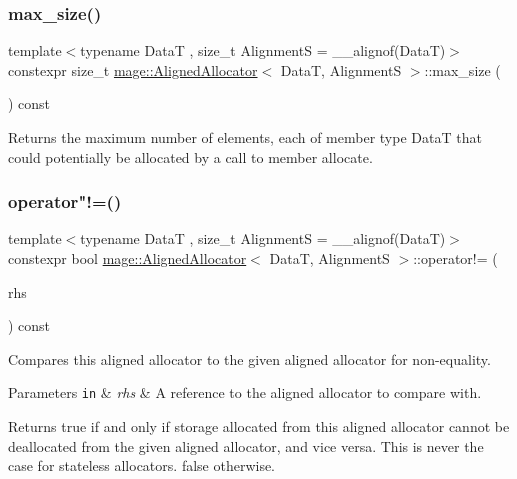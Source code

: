 \subsubsection{\texorpdfstring{max\+\_\+size()}{max\_size()}}
{\footnotesize\ttfamily template$<$typename DataT , size\+\_\+t AlignmentS = \+\_\+\+\_\+alignof(\+Data\+T)$>$ \\
constexpr size\+\_\+t \hyperlink{structmage_1_1_aligned_allocator}{mage\+::\+Aligned\+Allocator}$<$ DataT, AlignmentS $>$\+::max\+\_\+size (\begin{DoxyParamCaption}{ }\end{DoxyParamCaption}) const\hspace{0.3cm}{\ttfamily [noexcept]}}

Returns the maximum number of elements, each of member type {\ttfamily DataT} that could potentially be allocated by a call to member allocate. \hypertarget{structmage_1_1_aligned_allocator_ad5441594e288932744eb3d2528fc3ac7}{}\label{structmage_1_1_aligned_allocator_ad5441594e288932744eb3d2528fc3ac7} 
\subsubsection{\texorpdfstring{operator"!=()}{operator!=()}}
{\footnotesize\ttfamily template$<$typename DataT , size\+\_\+t AlignmentS = \+\_\+\+\_\+alignof(\+Data\+T)$>$ \\
constexpr bool \hyperlink{structmage_1_1_aligned_allocator}{mage\+::\+Aligned\+Allocator}$<$ DataT, AlignmentS $>$\+::operator!= (\begin{DoxyParamCaption}\item[{const \hyperlink{structmage_1_1_aligned_allocator}{Aligned\+Allocator}$<$ DataT, AlignmentS $>$ \&}]{rhs }\end{DoxyParamCaption}) const\hspace{0.3cm}{\ttfamily [noexcept]}}

Compares this aligned allocator to the given aligned allocator for non-\/equality.


\begin{DoxyParams}[1]{Parameters}
\mbox{\tt in}  & {\em rhs} & A reference to the aligned allocator to compare with. \\
\hline
\end{DoxyParams}
\begin{DoxyReturn}{Returns}
{\ttfamily true} if and only if storage allocated from this aligned allocator cannot be deallocated from the given aligned allocator, and vice versa. This is never the case for stateless allocators. {\ttfamily false} otherwise. 
\end{DoxyReturn}
\hypertarget{structmage_1_1_aligned_allocator_a4620c8e53ecc7294ff90d07e956810ed}{}\label{structmage_1_1_aligned_allocator_a4620c8e53ecc7294ff90d07e956810ed} 
